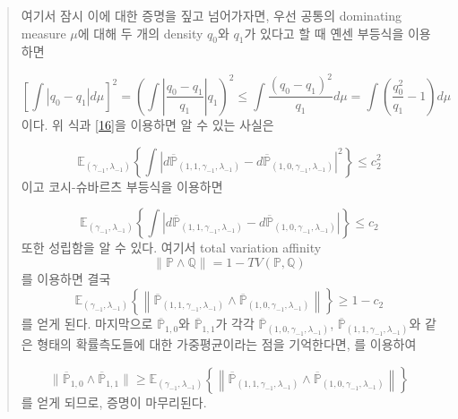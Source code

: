 \begin{quote}
여기서 잠시 이에 대한 증명을 짚고 넘어가자면, 우선 공통의 dominating measure $\mu$에 대해 두 개의 density $q_0$와 $q_1$가 있다고 할 때 옌센 부등식을 이용하면

\[
\left[ \int |q_0-q_1| d\mu\right]^2 = \left( \int \left|\frac{q_0 - q_1}{q_1} \right| q_1 \right)^2 \le \int \frac{(q_0 - q_1)^2}{q_1} d\mu   = \int \left(\frac{q_0^2}{q_1} -1 \right)d\mu
\]
이다. 위 식과 \eqref{16}을 이용하면 알 수 있는 사실은

\[
\mathbb{E}_{(\gamma_{-1}, \lambda_{-1})}\left\{ \int \left| d\overline{\mathbb{P}}_{(1,1,\gamma_{-1}, \lambda_{-1})} - d\overline{\mathbb{P}}_{(1,0,\gamma_{-1}, \lambda_{-1})}  \right|^2 \right\} \le c_2^2
\]
이고 코시-슈바르츠 부등식을 이용하면 

\[
\mathbb{E}_{(\gamma_{-1}, \lambda_{-1})}\left\{ \int \left| d\overline{\mathbb{P}}_{(1,1,\gamma_{-1}, \lambda_{-1})} - d\overline{\mathbb{P}}_{(1,0,\gamma_{-1}, \lambda_{-1})}  \right| \right\} \le c_2
\]
또한 성립함을 알 수 있다. 여기서 total variation affinity
\[
\| \mathbb{P} \wedge \mathbb{Q}\| = 1- TV(\mathbb{P} , \mathbb{Q})
\]
를 이용하면 결국
\[
\mathbb{E}_{(\gamma_{-1}, \lambda_{-1})}\left\{ \left\| \overline{\mathbb{P}}_{(1,1,\gamma_{-1}, \lambda_{-1})} \wedge \overline{\mathbb{P}}_{(1,0,\gamma_{-1}, \lambda_{-1})}  \right\| \right\} \ge 1- c_2
\]
를 얻게 된다. 마지막으로 $\overline{\mathbb{P}}_{1,0}$와  $\overline{\mathbb{P}}_{1,1}$가 각각 $\overline{\mathbb{P}}_{(1,0,\gamma_{-1}, \lambda_{-1})}$, $\overline{\mathbb{P}}_{(1,1,\gamma_{-1}, \lambda_{-1})}$와 같은 형태의 확률측도들에 대한 가중평균이라는 점을 기억한다면, \cite[Lemma 4]{cai2012optimal}를 이용하여


\[
\| \overline{\mathbb{P}}_{1,0} \wedge \overline{\mathbb{P}}_{1,1}\| \ge \mathbb{E}_{(\gamma_{-1}, \lambda_{-1})}\left\{ \left\| \overline{\mathbb{P}}_{(1,1,\gamma_{-1}, \lambda_{-1})} \wedge \overline{\mathbb{P}}_{(1,0,\gamma_{-1}, \lambda_{-1})}  \right\| \right\}
\]
를 얻게 되므로, 증명이 마무리된다. \\


\end{quote}


\vspace{0.4cm}

